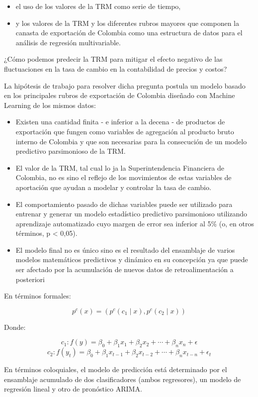\begin{itemize}
\item el uso de los valores de la TRM como serie de tiempo,
\item y los valores de la TRM y los diferentes rubros mayores que componen la canasta de exportación de Colombia como una estructura de datos para el análisis de regresión multivariable.
\end{itemize}

¿Cómo podemos predecir la TRM para mitigar el efecto negativo de las fluctuaciones en la tasa de cambio en la contabilidad de precios y costos?

La hipótesis de trabajo para resolver dicha pregunta postula un modelo basado en los principales rubros de exportación de Colombia diseñado con Machine Learning de los mismos datos:
\begin{itemize}
\item Existen una cantidad finita - e inferior a la decena - de productos de exportación que fungen como variables de agregación al producto bruto interno de Colombia y que son necesarias para la consecución de un modelo predictivo parsimonioso de la TRM.
\item El valor de la TRM, tal cual lo ja la Superintendencia Financiera de Colombia, no es sino el reflejo de los movimientos de estas variables de aportación que ayudan a modelar y controlar la tasa de cambio.
\item El comportamiento pasado de dichas variables puede ser utilizado para entrenar y generar un modelo estadístico predictivo parsimonioso utilizando aprendizaje automatizado cuyo margen de error sea inferior al 5\% (o, en otros términos, p < 0,05).
\item El modelo final no es único sino es el resultado del ensamblaje de varios modelos matemáticos predictivos y dinámico en su concepción ya que puede ser afectado por la acumulación de nuevos datos de retroalimentación a posteriori 
\end{itemize}

En términos formales:

\[ p^{c}(x) = (p^{c}(c_{1} \mid x),p^{c}(c_{2} \mid x)) \]

Donde:

\[ c_{1} : f(y) = \beta_{0} + \beta_{1}x_{1} + \beta_{2}x_{2} + \cdots + \beta_{n}x_{n} + \epsilon \]
\[ c_{2} : f(y_{t}) = \beta_{0} + \beta_{1}x_{t-1} + \beta_{2}x_{t-2} + \cdots + \beta_{n}x_{t-n} + \epsilon_{t}\]

En términos coloquiales, el modelo de predicción está determinado por el ensamblaje acumulado de dos clasificadores (ambos regresores), un modelo de regresión lineal y otro de pronóstico ARIMA.

